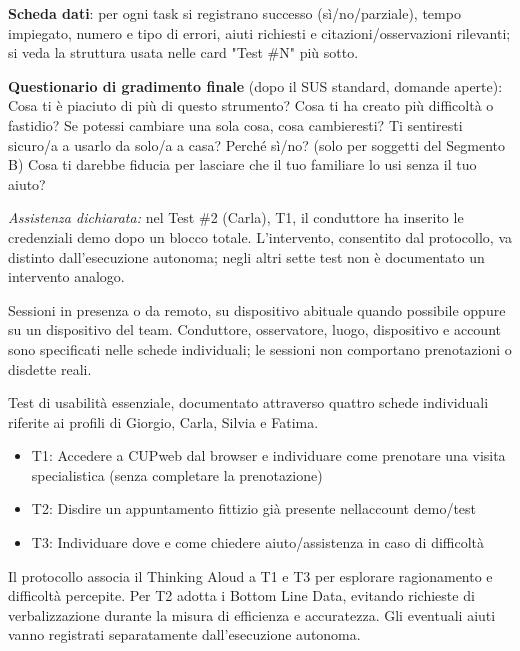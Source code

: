 \textbf{Scheda dati}: per ogni task si registrano successo
(sì/no/parziale), tempo impiegato, numero e tipo di errori, aiuti
richiesti e citazioni/osservazioni rilevanti; si veda la struttura
usata nelle card "Test \#N" più sotto.

\textbf{Questionario di gradimento finale} (dopo il SUS standard,
domande aperte): Cosa ti è piaciuto di più di questo strumento? Cosa
ti ha creato più difficoltà o fastidio? Se potessi cambiare una sola
cosa, cosa cambieresti? Ti sentiresti sicuro/a a usarlo da solo/a a
casa? Perché sì/no? (solo per soggetti del Segmento B) Cosa ti
darebbe fiducia per lasciare che il tuo familiare lo usi senza il tuo
aiuto?

\emph{Assistenza dichiarata:} nel Test \#2 (Carla), T1, il conduttore ha
inserito le credenziali demo dopo un blocco totale. L'intervento, consentito
dal protocollo, va distinto dall'esecuzione autonoma; negli altri sette
test non è documentato un intervento analogo.


Sessioni in presenza o da remoto, su dispositivo abituale quando possibile
oppure su un dispositivo del team. Conduttore, osservatore, luogo,
dispositivo e account sono specificati nelle schede individuali; le
sessioni non comportano prenotazioni o disdette reali.


Test di usabilità essenziale, documentato attraverso quattro schede
individuali riferite ai profili di Giorgio, Carla, Silvia e Fatima.


\begin{itemize}
\item
  T1: Accedere a CUPweb dal browser e individuare come prenotare una visita
  specialistica (senza completare la prenotazione)
\item
  T2: Disdire un appuntamento fittizio già presente
  nell\textquotesingle account demo/test
\item
  T3: Individuare dove e come chiedere aiuto/assistenza in caso di
  difficoltà
\end{itemize}


Il protocollo associa il Thinking Aloud a T1 e T3 per esplorare ragionamento
e difficoltà percepite. Per T2 adotta i Bottom Line Data, evitando richieste
di verbalizzazione durante la misura di efficienza e accuratezza. Gli
eventuali aiuti vanno registrati separatamente dall'esecuzione autonoma.

